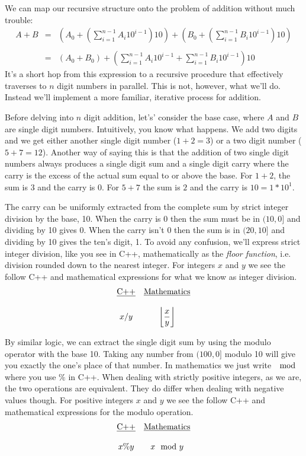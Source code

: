 \documentclass[10pt]{article}
\begin{document}
We can map our recursive structure onto the problem of addition without much trouble:
\[
\begin{array}{rcl}
A+B &=& \left(A_0 + \left( \sum\limits_{i=1}^{n-1} A_i10^{i-1} \right)10  \right) +
\left(B_0 + \left( \sum\limits_{i=1}^{n-1} B_i10^{i-1} \right)10  \right) \\ \\

&=& (A_0 +  B_0) + \left( \sum\limits_{i=1}^{n-1} A_i10^{i-1} +
\sum\limits_{i=1}^{n-1} B_i10^{i-1} \right)10  
\end{array}
\]
It's a short hop from this expression to a recursive procedure that effectively traverses to $n$ digit numbers in parallel. This is not, however, what we'll do.  Instead we'll implement a more familiar, iterative process for addition. 

Before delving into $n$ digit addition, let's' consider the base case, where $A$ and $B$ are single digit numbers. Intuitively, you know what happens. We add two digits and we get either another single digit number ($1+2=3$) or a two digit number ($5+7=12$). Another way of saying this is that the addition of two single digit numbers always produces a single digit sum and a single digit carry where the carry is the excess of the actual sum equal to or above the base. For $1+2$, the sum is $3$ and the carry is $0$. For $5+7$ the sum is $2$ and the carry is $10 = 1 * 10^1$.  

The carry can be uniformly extracted from the complete sum by strict integer division by the base, 10. When the carry is $0$ then the sum must be in $(10,0]$ and dividing by 10 gives 0. When the carry isn't $0$ then the sum is in $(20,10]$ and dividing by 10 gives the ten's digit, 1. To avoid any confusion, we'll express strict integer division, like you see in C++, mathematically as the \textit{floor function}, i.e. division rounded down to the nearest integer. For integers $x$ and $y$ we see the follow C++ and mathematical expressions for what we know as integer division.
\[
\begin{array}{cc}
\mbox{\underline{C++}} & \mbox{\underline{Mathematics}} \\ \\
x/y & \left\lfloor\dfrac{x}{y}\right\rfloor 
\end{array}
\]

By similar logic, we can extract the single digit sum by using the modulo operator with the base 10. Taking any number from $(100,0]$ modulo 10 will give you exactly the one's place of that number. In mathematics we just write $\mod$ where you use $\%$ in C++. When dealing with strictly positive integers, as we are, the two operations are equivalent. They do differ when dealing with negative values though. For positive integers $x$ and $y$ we see the follow C++ and mathematical expressions for the modulo operation.
\[
\begin{array}{cc}
\mbox{\underline{C++}} & \mbox{\underline{Mathematics}} \\ \\
x\%y & x \mod y
\end{array}
\]
\end{document}
